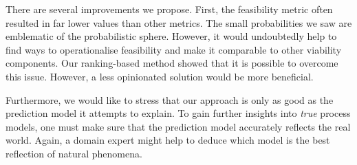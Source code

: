 \documentclass[./../../paper.tex]{subfiles}
\begin{document}
There are several improvements we propose. First, the feasibility metric often resulted in far lower values than other metrics. The small probabilities we saw are emblematic of the probabilistic sphere. However, it would undoubtedly help to find ways to operationalise feasibility and make it comparable to other viability components. Our ranking-based method showed that it is possible to overcome this issue. However, a less opinionated solution would be more beneficial. 

Furthermore, we would like to stress that our approach is only as good as the prediction model it attempts to explain. To gain further insights into \emph{true} process models, one must make sure that the prediction model accurately reflects the real world. Again, a domain expert might help to deduce which model is the best reflection of natural phenomena.


\end{document}

